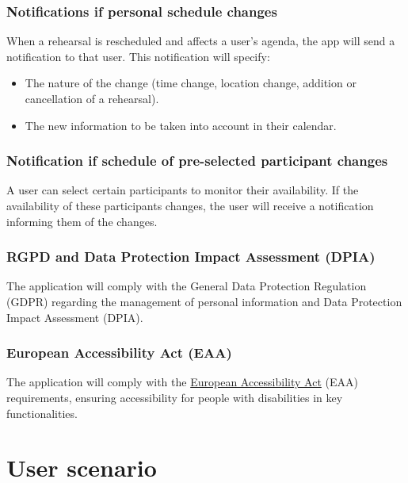 \documentclass[11pt]{article}
\begin{document}
\subsubsection{Notifications if personal schedule changes}
When a rehearsal is rescheduled and affects a user's agenda, the app will send a notification to that user. This notification will specify:
\begin{itemize}
    \item The nature of the change (time change, location change, addition or cancellation of a rehearsal).
    \item The new information to be taken into account in their calendar.
\end{itemize}

\subsubsection{Notification if schedule of pre-selected participant changes}
A user can select certain participants to monitor their availability. If the availability of these participants changes, the user will receive a notification informing them of the changes.

\subsubsection{RGPD and Data Protection Impact Assessment (DPIA)}
The application will comply with the General Data Protection Regulation (GDPR) regarding the management of personal information and Data Protection Impact Assessment (DPIA).

\subsubsection{European Accessibility Act (EAA)}
The application will comply with the \href{https://eur-lex.europa.eu/legal-content/EN/TXT/?uri=CELEX%3A32019L0882}{European Accessibility Act} (EAA) requirements, ensuring accessibility for people with disabilities in key functionalities.

\section{User scenario}
\end{document}
